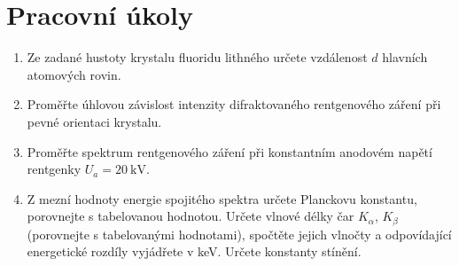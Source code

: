 \documentclass[a4paper]{article}
\author{Vladislav Wohlrath}
\begin{document}
\begin{titlepage}

\end{titlepage}

\section*{Pracovní úkoly}
\begin{enumerate}
\item Ze zadané hustoty krystalu fluoridu lithného určete vzdálenost $d$ hlavních atomových rovin.
\item Proměřte úhlovou závislost intenzity difraktovaného rentgenového záření při pevné orientaci krystalu.
\item Proměřte spektrum rentgenového záření při konstantním anodovém napětí rentgenky $U_a = \SI{20}{\kilo\volt}$.
\item Z mezní hodnoty energie spojitého spektra určete Planckovu konstantu, porovnejte s tabelovanou hodnotou. Určete vlnové délky čar $K_\alpha$, $K_\beta$ (porovnejte s tabelovanými hodnotami), spočtěte jejich vlnočty a odpovídající energetické rozdíly vyjádřete v \si{\keV}. Určete konstanty stínění.

\end{enumerate}










\printbibliography[title={Seznam použité literatury}]
\end{document}
